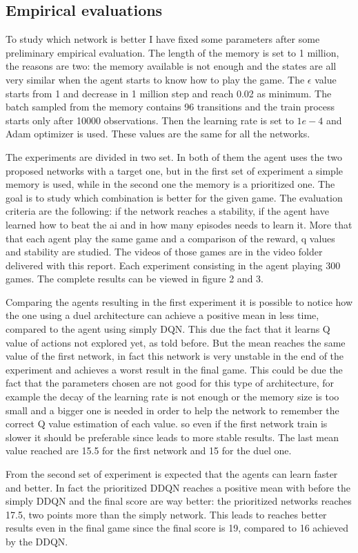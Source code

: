 \documentclass[10pt]{article}
\begin{document}
\begin{multicols}{2}
\section{Empirical evaluations}
To study which network is better I have fixed some parameters after some preliminary empirical evaluation. The length of the memory is set to 1 million, the reasons are two: the memory available is not enough and the states are all very similar when the agent starts to know how to play the game. The $\epsilon$ value starts from 1 and decrease in 1 million step and reach 0.02 as minimum. The batch sampled from the memory contains 96 transitions and the train process starts only after 10000 observations. Then the learning rate is set to $1e-4$ and Adam optimizer is used. These values are the same for all the networks. 

The experiments are divided in two set. In both of them the agent uses the two proposed networks with a target one, but in the first set of experiment a simple memory is used, while in the second one the memory is a prioritized one. The goal is to study which combination is better for the given game. The evaluation criteria are the following: if the network reaches a stability, if the agent have learned how to beat the ai and in how many episodes needs to learn it. More that that each agent play the same game and a comparison of the reward, q values and stability are studied. The videos of those games are in the video folder delivered with this report. Each experiment consisting in the agent playing 300 games. The complete results can be viewed in figure 2 and 3.

Comparing the agents resulting in the first experiment it is possible to notice how the one using a duel architecture can achieve a positive mean in less time, compared to the agent using simply DQN. This due the fact that it learns Q value of actions not explored yet, as told before. But the mean reaches the same value of the first network, in fact this network is very unstable in the end of the experiment and achieves a worst result in the final game. This could be due the fact that the parameters chosen are not good for this type of architecture, for example the decay of the learning rate is not enough or the memory size is too small and a bigger one is needed in order to help the network to remember the correct Q value estimation of each value. so even if the first network train is slower it should be preferable since leads to more stable results. The last mean value reached are 15.5 for the first network and 15 for the duel one.

From the second set of experiment is expected that the agents can learn faster and better. In fact the prioritized DDQN reaches a positive mean with before the simply DDQN and the final score are way better: the prioritized networks reaches 17.5, two points more than the simply network. This leads to reaches better results even in the final game since the final score is 19, compared to 16 achieved by the DDQN. 
\end{multicols}
\end{document}
